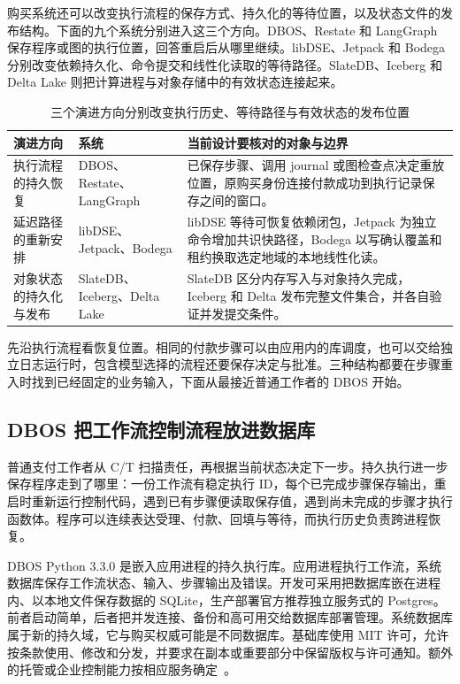 购买系统还可以改变执行流程的保存方式、持久化的等待位置，以及状态文件的发布结构。下面的九个系统分别进入这三个方向。DBOS、Restate 和 LangGraph 保存程序或图的执行位置，回答重启后从哪里继续。libDSE、Jetpack 和 Bodega 分别改变依赖持久化、命令提交和线性化读取的等待路径。SlateDB、Iceberg 和 Delta Lake 则把计算进程与对象存储中的有效状态连接起来。

\begin{table}[htbp]
\centering\small
\begin{tabularx}{\linewidth}{@{}p{.17\linewidth}p{.24\linewidth}X@{}}
\toprule
演进方向 & 系统 & 当前设计要核对的对象与边界 \\
\midrule
执行流程的持久恢复 & DBOS、Restate、LangGraph & 已保存步骤、调用 journal 或图检查点决定重放位置，原购买身份连接付款成功到执行记录保存之间的窗口。 \\
延迟路径的重新安排 & libDSE、Jetpack、Bodega & libDSE 等待可恢复依赖闭包，Jetpack 为独立命令增加共识快路径，Bodega 以写确认覆盖和租约换取选定地域的本地线性化读。 \\
对象状态的持久化与发布 & SlateDB、Iceberg、Delta Lake & SlateDB 区分内存写入与对象持久完成，Iceberg 和 Delta 发布完整文件集合，并各自验证并发提交条件。 \\
\bottomrule
\end{tabularx}
\caption{三个演进方向分别改变执行历史、等待路径与有效状态的发布位置}
\label{tab:ch21-frontier-directions}
\end{table}

先沿执行流程看恢复位置。相同的付款步骤可以由应用内的库调度，也可以交给独立日志运行时，包含模型选择的流程还要保存决定与批准。三种结构都要在步骤重入时找到已经固定的业务输入，下面从最接近普通工作者的 DBOS 开始。

\subsection{DBOS 把工作流控制流程放进数据库}

普通支付工作者从 C/T 扫描责任，再根据当前状态决定下一步。持久执行进一步保存程序走到了哪里：一份工作流有稳定执行 ID，每个已完成步骤保存输出，重启时重新运行控制代码，遇到已有步骤便读取保存值，遇到尚未完成的步骤才执行函数体。程序可以连续表达受理、付款、回填与等待，而执行历史负责跨进程恢复。

DBOS Python 3.3.0 是嵌入应用进程的持久执行库。应用进程执行工作流，系统数据库保存工作流状态、输入、步骤输出及错误。开发可采用把数据库嵌在进程内、以本地文件保存数据的 SQLite，生产部署官方推荐独立服务式的 Postgres。前者启动简单，后者把并发连接、备份和高可用交给数据库部署管理。系统数据库属于新的持久域，它与购买权威可能是不同数据库。基础库使用 MIT 许可，允许按条款使用、修改和分发，并要求在副本或重要部分中保留版权与许可通知。额外的托管或企业控制能力按相应服务确定~\cite{ch21-dbos}。

